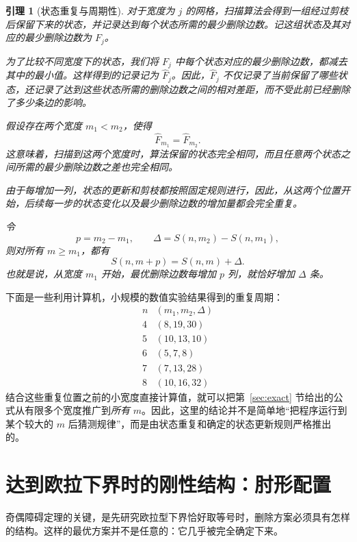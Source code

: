 \documentclass[11pt]{ctexart}
\newtheorem{lemma}[theorem]{引理}
\theoremstyle{definition}
\begin{document}
\begin{lemma}[状态重复与周期性]\label{lem:cert}
对于宽度为 $j$ 的网格，扫描算法会得到一组经过剪枝后保留下来的状态，并记录达到每个状态所需的最少删除边数。记这组状态及其对应的最少删除边数为 $F_j$。

为了比较不同宽度下的状态，我们将 $F_j$ 中每个状态对应的最少删除边数，都减去其中的最小值。这样得到的记录记为 $\widehat F_j$。因此，$\widehat F_j$ 不仅记录了当前保留了哪些状态，还记录了达到这些状态所需的删除边数之间的相对差距，而不受此前已经删除了多少条边的影响。

假设存在两个宽度 $m_1<m_2$，使得
\[
\widehat F_{m_1}=\widehat F_{m_2}.
\]
这意味着，扫描到这两个宽度时，算法保留的状态完全相同，而且任意两个状态之间所需的最少删除边数之差也完全相同。

由于每增加一列，状态的更新和剪枝都按照固定规则进行，因此，从这两个位置开始，后续每一步的状态变化以及最少删除边数的增加量都会完全重复。

令
\[
p=m_2-m_1,\qquad
\Delta=S(n,m_2)-S(n,m_1),
\]
则对所有 $m\ge m_1$，都有
\[
S(n,m+p)=S(n,m)+\Delta.
\]
也就是说，从宽度 $m_1$ 开始，最优删除边数每增加 $p$ 列，就恰好增加 $\Delta$ 条。
\end{lemma}



下面是一些利用计算机，小规模的数值实验结果得到的重复周期：
\[
\begin{array}{c|c}
n &(m_1,m_2,\Delta)\\ \hline
4 &(8,19,30)\\
5 &(10,13,10)\\
6 &(5,7,8)\\
7 &(7,13,28)\\
8 &(10,16,32)
\end{array}
\]
结合这些重复位置之前的小宽度直接计算值，就可以把第~\ref{sec:exact} 节给出的公式从有限多个宽度推广到\emph{所有} $m$。因此，这里的结论并不是简单地“把程序运行到某个较大的 $m$ 后猜测规律”，而是由状态重复和确定的状态更新规则严格推出的。
\section{达到欧拉下界时的刚性结构：肘形配置}\label{sec:rigid}

奇偶障碍定理的关键，是先研究欧拉型下界恰好取等号时，删除方案必须具有怎样的结构。这样的最优方案并不是任意的：它几乎被完全确定下来。
\end{document}
